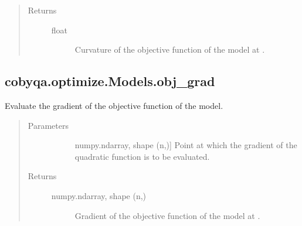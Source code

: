 \documentclass[letterpaper,10pt,english]{sphinxmanual}
\begin{document}
\begin{fulllineitems}
\begin{fulllineitems}
\begin{quote}
\begin{description}
\begin{description}
\end{description}

\item[{Returns}] \leavevmode\begin{description}
\item[{float}] \leavevmode
\sphinxAtStartPar
Curvature of the objective function of the model at .

\end{description}

\end{description}\end{quote}

\end{fulllineitems}



\subsection{cobyqa.optimize.Models.obj\_grad}
\label{\detokenize{refs/generated/cobyqa.optimize.Models.obj_grad:cobyqa-optimize-models-obj-grad}}\label{\detokenize{refs/generated/cobyqa.optimize.Models.obj_grad::doc}}

\begin{fulllineitems}
\label{\detokenize{refs/generated/cobyqa.optimize.Models.obj_grad:cobyqa.optimize.Models.obj_grad}}
\sphinxAtStartPar
Evaluate the gradient of the objective function of the model.
\begin{quote}\begin{description}
\item[{Parameters}] \leavevmode\begin{description}
\item[{}] \leavevmode{[}numpy.ndarray, shape (n,){]}
\sphinxAtStartPar
Point at which the gradient of the quadratic function is to be
evaluated.

\end{description}

\item[{Returns}] \leavevmode\begin{description}
\item[{numpy.ndarray, shape (n,)}] \leavevmode
\sphinxAtStartPar
Gradient of the objective function of the model at .


\end{description}
\end{description}
\end{quote}
\end{fulllineitems}
\end{fulllineitems}
\end{document}
